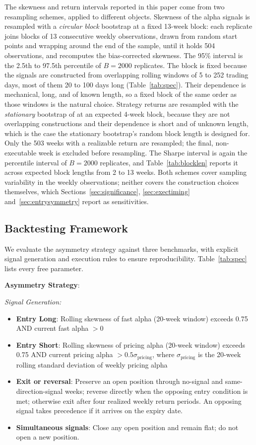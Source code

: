 \documentclass[11pt]{article}
\begin{document}
The skewness and return intervals reported in this paper come from two resampling schemes, applied to different objects. Skewness of the alpha signals is resampled with a \emph{circular block} bootstrap at a fixed 13-week block: each replicate joins blocks of 13 consecutive weekly observations, drawn from random start points and wrapping around the end of the sample, until it holds 504 observations, and recomputes the bias-corrected skewness. The 95\% interval is the 2.5th to 97.5th percentile of $B = 2000$ replicates. The block is fixed because the signals are constructed from overlapping rolling windows of 5 to 252 trading days, most of them 20 to 100 days long (Table~\ref{tab:spec}). Their dependence is mechanical, long, and of known length, so a fixed block of the same order as those windows is the natural choice. Strategy returns are resampled with the \emph{stationary} bootstrap of \citet{politis1994stationary} at an expected 4-week block, because they are not overlapping constructions and their dependence is short and of unknown length, which is the case the stationary bootstrap's random block length is designed for. Only the 503 weeks with a realizable return are resampled; the final, non-executable week is excluded before resampling. The Sharpe interval is again the percentile interval of $B = 2000$ replicates, and Table~\ref{tab:blocklen} reports it across expected block lengths from 2 to 13 weeks. Both schemes cover sampling variability in the weekly observations; neither covers the construction choices themselves, which Sections~\ref{sec:significance}, \ref{sec:exectiming} and~\ref{sec:entrysymmetry} report as sensitivities.

\subsection{Backtesting Framework}
\label{sec:backtestmethod}

We evaluate the asymmetry strategy against three benchmarks, with explicit signal generation and execution rules to ensure reproducibility. Table~\ref{tab:spec} lists every free parameter.

\textbf{Asymmetry Strategy}:

\textit{Signal Generation:}
\begin{itemize}
    \item \textbf{Entry Long}: Rolling skewness of fast alpha (20-week window) exceeds 0.75 AND current fast alpha $> 0$
    \item \textbf{Entry Short}: Rolling skewness of pricing alpha (20-week window) exceeds 0.75 AND current pricing alpha $> 0.5\sigma_{\text{pricing}}$, where $\sigma_{\text{pricing}}$ is the 20-week rolling standard deviation of weekly pricing alpha
    \item \textbf{Exit or reversal}: Preserve an open position through no-signal and same-direction-signal weeks; reverse directly when the opposing entry condition is met; otherwise exit after four realized weekly return periods. An opposing signal takes precedence if it arrives on the expiry date.
    \item \textbf{Simultaneous signals}: Close any open position and remain flat; do not open a new position.
\end{itemize}
\end{document}
